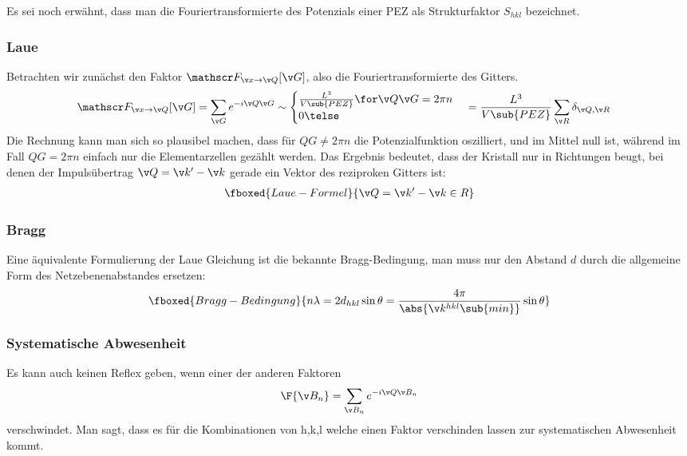 \documentclass[bfvec]{summery_5.0}
\begin{document}
Es sei noch erwähnt, dass man die Fouriertransformierte des Potenzials einer PEZ als Strukturfaktor $S_{hkl}$ bezeichnet.

\subsubsection{Laue}
Betrachten wir zunächst den Faktor $\mathscr F_{\v x\to \v Q}[\v G]$, also die Fouriertransformierte des Gitters.
\begin{align*}
    \mathscr F_{\v x\to \v Q}[\v G] &= \sum_{\v G} e^{-i \v Q \v G} \sim \begin{cases}
        \frac{L^3}{V\sub{PEZ}} \for \v Q \v G = 2\pi n\\
        0 \telse 
    \end{cases} = \frac{L^3}{V\sub{PEZ}}\sum_{\v R}\delta_{\v Q,\v R}
\end{align*}
Die Rechnung kann man sich so plausibel machen, dass für $ Q G \neq 2\pi n$ die Potenzialfunktion oszilliert, und im Mittel null ist, während im Fall $Q G =2\pi n$ einfach nur die Elementarzellen gezählt werden. 
Das Ergebnis bedeutet, dass der Kristall nur in Richtungen beugt, bei denen der Impulsübertrag $\v Q = \v k' - \v k$ gerade ein Vektor des reziproken Gitters ist:
\begin{align*}
    \fboxed{Laue-Formel}{\v Q = \v k' - \v k \in R}
\end{align*}

\subsubsection{Bragg}
Eine äquivalente Formulierung der Laue Gleichung ist die bekannte Bragg-Bedingung, man muss nur den Abstand $d$ durch die allgemeine Form des Netzebenenabstandes ersetzen:
\begin{align*}
    \fboxed{Bragg-Bedingung}{n\lambda = 2d_{hkl}\sin\theta = \frac{4\pi}{\abs{\v k^{hkl}\sub{min}}} \sin\theta}
\end{align*}

\subsubsection{Systematische Abwesenheit}
Es kann auch keinen Reflex geben, wenn einer der anderen Faktoren
\begin{align*}
    \F{\v B_n}
    = \sum_{\v B_n}e^{-i\v Q\v B_n}
\end{align*}
verschwindet. Man sagt, dass es für die Kombinationen von h,k,l welche einen Faktor verschinden lassen zur systematischen Abwesenheit kommt.
\end{document}

